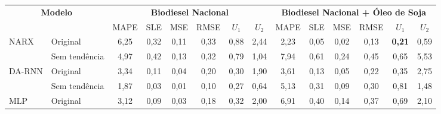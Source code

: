 \begin{tabular}{llcccccccccccc}
	\toprule
	\multicolumn{2}{c}{\textbf{Modelo}} & \multicolumn{6}{c}{\textbf{Biodiesel Nacional}} & \multicolumn{6}{c}{\textbf{Biodiesel Nacional + Óleo de Soja}}                                                                                                                                                                                 \\
	\cmidrule(lr){3-8} \cmidrule(lr){9-14}
	                                    &                                                 & MAPE                                                           & SLE           & MSE           & RMSE          & \(U_1\)       & \(U_2\)       & MAPE          & SLE           & MSE           & RMSE          & \(U_1\)       & \(U_2\)       \\
	\midrule
	\multirow{2}{*}{\ac{NARX}}
	                                    & Original                                        & 6,25                                                           & 0,32          & 0,11          & 0,33          & 0,88          & 2,44          & 2,23          & 0,05          & 0,02          & 0,13          & \textbf{0,21} & 0,59          \\
	                                    & Sem tendência                                   & 4,97                                                           & 0,42          & 0,13          & 0,32          & 0,79          & 1,04          & 7,94          & 0,61          & 0,24          & 0,45          & 0,65          & 5,53          \\
	\midrule
	\multirow{2}{*}{\ac{DA-RNN}}
	                                    & Original                                        & 3,34                                                           & 0,11          & 0,04          & 0,20          & 0,30          & 1,90          & 3,61          & 0,13          & 0,05          & 0,22          & 0,35          & 2,75          \\
	                                    & Sem tendência                                   & 1,87                                                           & 0,03          & 0,01          & 0,10          & 0,27          & 0,64          & 5,13          & 0,31          & 0,09          & 0,30          & 0,81          & 1,48          \\
	\midrule
	\multirow{2}{*}{\ac{MLP}}
	                                    & Original                                        & 3,12                                                           & 0,09          & 0,03          & 0,18          & 0,32          & 2,00          & 6,91          & 0,40          & 0,14          & 0,37          & 0,69          & 2,10          \\

\end{tabular}

